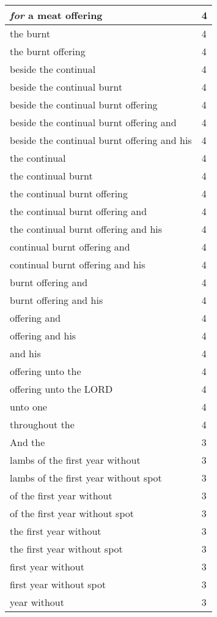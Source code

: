 \begin{center}
\begin{longtable}{|p{3.0in}|p{0.5in}|}
\emph{for} a meat offering & 4\\ \hline 
the burnt & 4\\ \hline 
the burnt offering & 4\\ \hline 
beside the continual & 4\\ \hline 
beside the continual burnt & 4\\ \hline 
beside the continual burnt offering & 4\\ \hline 
beside the continual burnt offering and & 4\\ \hline 
beside the continual burnt offering and his & 4\\ \hline 
the continual & 4\\ \hline 
the continual burnt & 4\\ \hline 
the continual burnt offering & 4\\ \hline 
the continual burnt offering and & 4\\ \hline 
the continual burnt offering and his & 4\\ \hline 
continual burnt offering and & 4\\ \hline 
continual burnt offering and his & 4\\ \hline 
burnt offering and & 4\\ \hline 
burnt offering and his & 4\\ \hline 
offering and & 4\\ \hline 
offering and his & 4\\ \hline 
and his & 4\\ \hline 
offering unto the & 4\\ \hline 
offering unto the LORD & 4\\ \hline 
unto one & 4\\ \hline 
throughout the & 4\\ \hline 
And the & 3\\ \hline 
lambs of the first year without & 3\\ \hline 
lambs of the first year without spot & 3\\ \hline 
of the first year without & 3\\ \hline 
of the first year without spot & 3\\ \hline 
the first year without & 3\\ \hline 
the first year without spot & 3\\ \hline 
first year without & 3\\ \hline 
first year without spot & 3\\ \hline 
year without & 3\\ \hline 

\end{longtable}
\end{center}
